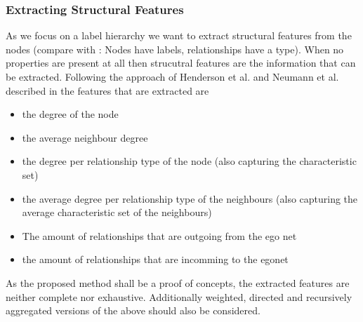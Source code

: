 \subsubsection{Extracting Structural Features}\label{\positionnumber}
As we focus on a label hierarchy we want to extract structural features from the nodes (compare with : Nodes have labels, relationships have a type).
When no properties are present at all then strucutral features are the information that can be extracted. Following the approach of Henderson et al. and Neumann et al. described in  the features that are extracted are
\begin{itemize}
    \item the degree of the node
    \item the average neighbour degree
    \item the degree per relationship type of the node (also capturing the characteristic set)
    \item the average degree per relationship type of the neighbours (also capturing the average characteristic set of the neighbours)
    \item The amount of relationships that are outgoing from the ego net
    \item the amount of relationships that are incomming to the egonet
\end{itemize}
As the proposed method shall be a proof of concepts, the extracted features are neither complete nor exhaustive. Additionally weighted, directed and recursively aggregated versions of the above should also be considered.

